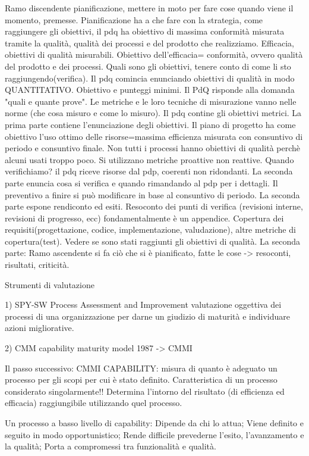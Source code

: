 \documentclass{report}
\begin{document}
Ramo discendente pianificazione, mettere in moto per fare cose quando viene il momento, premesse. 
Pianificazione ha a che fare con la strategia, come raggiungere gli obiettivi, il pdq ha obiettivo di massima conformità misurata tramite la qualità, qualità dei processi e del prodotto che realizziamo. Efficacia, obiettivi di qualità misurabili. 
Obiettivo dell'efficacia= conformità, ovvero qualità del prodotto e dei processi. Quali sono gli obiettivi, tenere conto di come li sto raggiungendo(verifica).
Il pdq comincia enunciando obiettivi di qualità in modo QUANTITATIVO. Obiettivo e punteggi minimi.
Il PdQ risponde alla domanda "quali e quante prove".
Le metriche e le loro tecniche di misurazione vanno nelle norme (che cosa misuro e come lo misuro). Il pdq contine gli obiettivi metrici. La prima parte contiene l'enunciazione degli obiettivi.
Il piano di progetto ha come obiettivo l'uso ottimo delle risorse=massima efficienza misurata con consuntivo di periodo e consuntivo finale.
Non tutti i processi hanno obiettivi di qualità perchè alcuni usati troppo poco. Si utilizzano metriche proattive non reattive.
Quando verifichiamo? il pdq riceve risorse dal pdp, coerenti non ridondanti.
La seconda parte enuncia cosa si verifica e quando rimandando al pdp per i dettagli. Il preventivo a finire si può modificare in base al consuntivo di periodo.
La seconda parte espone rendiconto ed esiti. Resoconto dei punti di verifica (revisioni interne, revisioni di progresso, ecc) fondamentalmente è un appendice. Copertura dei requisiti(progettazione, codice, implementazione, valudazione), altre metriche di copertura(test). Vedere se sono stati raggiunti gli obiettivi di qualità.
La seconda parte: Ramo ascendente si fa ciò che si è pianificato, fatte le cose -> resoconti, risultati, criticità.


Strumenti di valutazione

1) SPY-SW Process Assessment and Improvement
valutazione oggettiva dei processi di una organizzazione per darne un giudizio di maturità e individuare azioni migliorative.

2) CMM capability maturity model 1987 -> CMMI

Il passo successivo: CMMI
CAPABILITY: misura di quanto è adeguato un processo per gli scopi per cui è stato definito.
Caratteristica di un processo considerato singolarmente!!
Determina l’intorno del risultato (di efficienza ed efficacia) raggiungibile utilizzando quel processo.

Un processo a basso livello di capability: Dipende da chi lo attua; Viene definito e seguito in modo opportunistico; Rende difficile prevederne l’esito, l’avanzamento e la qualità; Porta a compromessi tra funzionalità e qualità.
\end{document}
